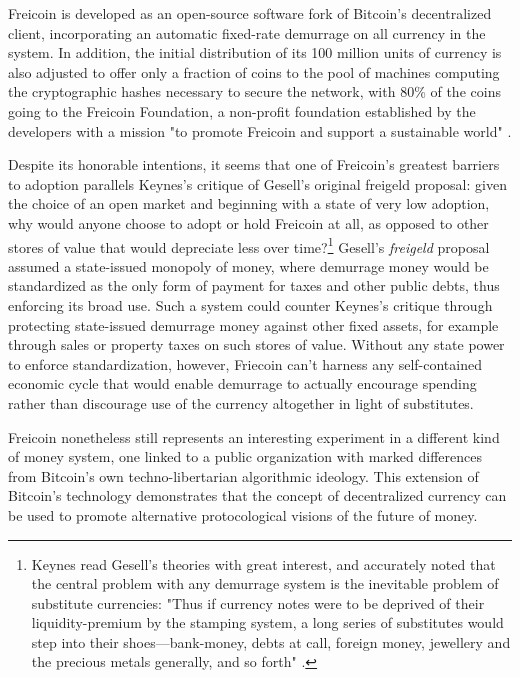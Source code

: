 Freicoin is developed as an open-source software fork of Bitcoin's decentralized client, incorporating an automatic fixed-rate demurrage on all currency in the system. In addition, the initial distribution of its 100 million units of currency is also adjusted to offer only a fraction of coins to the pool of machines computing the cryptographic hashes necessary to secure the network, with 80\% of the coins going to the Freicoin Foundation, a non-profit foundation established by the developers with a mission "to promote Freicoin and support a sustainable world" \autocite{FreicoinHow}.

Despite its honorable intentions, it seems that one of Freicoin's greatest barriers to adoption parallels Keynes's critique of Gesell's original freigeld proposal: given the choice of an open market and beginning with a state of very low adoption, why would anyone choose to adopt or hold Freicoin at all, as opposed to other stores of value that would depreciate less over time?\footnote{
  Keynes read Gesell's theories with great interest, and accurately noted that the central problem with any demurrage system is the inevitable problem of substitute currencies: "Thus if currency notes were to be deprived of their liquidity-premium by the stamping system, a long series of substitutes would step into their shoes---bank-money, debts at call, foreign money, jewellery and the precious metals generally, and so forth" \autocite*[bk.~6,~ch.~23,~sec.~6]{Keynes1936}.
}
Gesell's \emph{freigeld} proposal assumed a state-issued monopoly of money, where demurrage money would be standardized as the only form of payment for taxes and other public debts, thus enforcing its broad use. Such a system could counter Keynes's critique through protecting state-issued demurrage money against other fixed assets, for example through sales or property taxes on such stores of value. Without any state power to enforce standardization, however, Friecoin can't harness any self-contained economic cycle that would enable demurrage to actually encourage spending rather than discourage use of the currency altogether in light of substitutes.

Freicoin nonetheless still represents an interesting experiment in a different kind of money system, one linked to a public organization with marked differences from Bitcoin's own techno-libertarian algorithmic ideology. This extension of Bitcoin's technology demonstrates that the concept of decentralized currency can be used to promote alternative protocological visions of the future of money.

